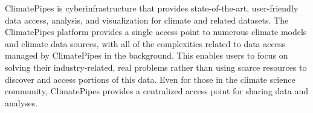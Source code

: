 \documentclass[a0,landscape]{a0poster}
\newenvironment{pcol}[1]{
  \begin{minipage}[t]{#1}
}{
  \end{minipage}
}
\begin{document}
\begin{textblock}{35}
\begin{pcol}{\threecolwidth}
ClimatePipes is cyberinfrastructure that provides state-of-the-art, user-friendly data access, analysis, and
visualization for climate and related datasets. The ClimatePipes platform provides a single access point
to numerous climate models and climate data sources, with all of the complexities related to data access
managed by ClimatePipes in the background. This enables users to focus on solving their industry-related,
real problems rather than using scarce resources to discover and access portions of this data. Even
for those in the climate science community, ClimatePipes provides a centralized access point for sharing
data and analyses.

\end{pcol}
\end{textblock}

\end{document}
